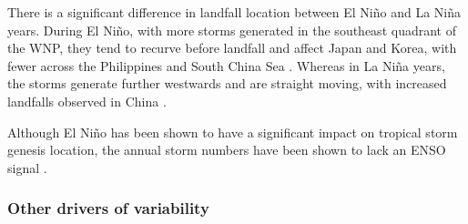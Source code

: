 There is a significant difference in landfall location between El Ni\~{n}o and La Ni\~{n}a years. During El Ni\~{n}o, with more storms generated in the southeast quadrant of the WNP, they tend to recurve before landfall and affect Japan and Korea, with fewer across the Philippines and South China Sea \citep{liu2008interdecadal}. Whereas in La Ni\~{n}a years, the storms generate further westwards and are straight moving, with increased landfalls observed in China \citep{camargo2007cluster}.



Although El Ni\~{n}o has been shown to have a significant impact on tropical storm genesis location, the annual storm numbers have been shown to lack an ENSO signal \citep{lander1994exploratory}.






\subsubsection{Other drivers of variability}

